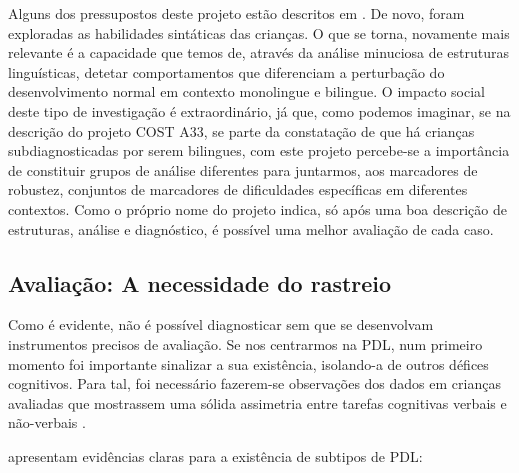 \documentclass[output=paper,colorlinks,citecolor=brown,booklanguage=portuguese]{langscibook}
\begin{document}
Alguns dos pressupostos deste projeto estão descritos em \citet{ArmonLotem2010}. De novo, foram exploradas as habilidades sintáticas das crianças. O que se torna, novamente mais relevante é a capacidade que temos de, através da análise minuciosa de estruturas linguísticas, detetar comportamentos que diferenciam a perturbação do desenvolvimento normal em contexto monolingue e bilingue. O impacto social deste tipo de investigação é extraordinário, já que, como podemos imaginar, se na descrição do projeto COST A33, se parte da constatação de que há crianças subdiagnosticadas por serem bilingues, com este projeto percebe-se a importância de constituir grupos de análise diferentes para juntarmos, aos marcadores de robustez, conjuntos de marcadores de dificuldades específicas em diferentes contextos. Como o próprio nome do projeto indica, só após uma boa descrição de estruturas, análise e diagnóstico, é possível uma melhor avaliação de cada caso.


\subsection{Avaliação: A necessidade do rastreio}
Como é evidente, não é possível diagnosticar sem que se desenvolvam instrumentos precisos de avaliação. Se nos centrarmos na PDL, num primeiro momento foi importante sinalizar a sua existência, isolando-a de outros défices cognitivos. Para tal, foi necessário fazerem-se observações dos dados em crianças avaliadas que mostrassem uma sólida assimetria entre tarefas cognitivas verbais e não-verbais \citep{Bishop1979}.

\citet{Friedmann2008} apresentam evidências claras para a existência de subtipos de PDL:
\end{document}
